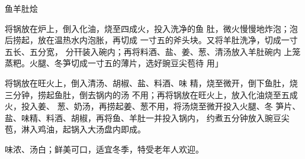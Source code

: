 \begin{recipe}{鱼羊肚烩}

\ingredients



\cooking

\step 将锅放在炉上，倒入化油，烧至四成火，投入洗净的鱼 肚，微火慢慢地炸泡；泡后捞起，放在温热水内泡胀，再切成 一寸五的斧头块。又将羊肚洗净，切成一寸五长、五分宽， 分幵装入碗内；再将料酒、盐、姜、葱、清汤放入羊肚碗内 上笼蒸粑。火腿、冬笋切成一寸五的薄片，选好豌豆尖苞待 用」

\step 将锅放在旺火上，倒入清汤、胡椒、盐、料酒、味 精，烧至微开，倒下鱼肚，烧三分钟，捞起鱼肚，倒去锅内的汤 不用；再将锅放在旺火上，放入化油烧至五成火，投入姜、 葱、奶汤，再捞起姜、葱不用，将汤烧至微开投入火腿、冬 笋片、盐、味精、料酒、胡椒，再将鱼、羊肚一并投入锅内， 约煮五分钟放入豌豆尖苞，淋入鸡油，起锅入大汤盘内即成。

\notes

味浓、汤白；鲜美可口，适宜冬季，特受老年人欢迎。

\end{recipe}

